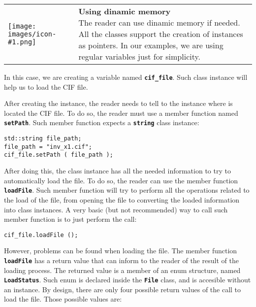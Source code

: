 \documentclass[11pt,twoside,openany,x11names,svgnames]{memoir}
\makeatletter
\newcommand{\IconNote}[3]
{
	\begin{table}[ht]
	\begin{tabular}{ lm{\dimexpr\textwidth-8\tabcolsep-\wd0}@{}}
		\toprule
		\texttt{[image: images/icon-\#1.png]}
		&
		\parbox[t]{155mm}{
		\textbf{#2} \\
		#3
		}
	\end{tabular}
\end{table}
}
\makeatother
\begin{document}
\IconNote
	{info}
	{Using dinamic memory}
	{The reader can use dinamic memory if needed. All the classes support the creation of instances as pointers. In our examples, we are using regular variables just for simplicity.}

In this case, we are creating a variable named \textbf{\texttt{cif\_file}}. Such class instance will help us to load the CIF file.

After creating the instance, the reader needs to tell to the instance where is located the CIF file. To do so, the reader must use a member function named \textbf{\texttt{setPath}}. Such member function expects a \textbf{\texttt{string}} class instance:

\begin{lstlisting}[frame=single,style=CPPStyle]
std::string file_path;
file_path = "inv_x1.cif";
cif_file.setPath ( file_path );
\end{lstlisting}

After doing this, the class instance has all the needed information to try to automatically load the file. To do so, the reader can use the member function \textbf{\texttt{loadFile}}. Such member function will try to perform all the operations related to the load of the file, from opening the file to converting the loaded information into class instances. A very basic (but not recommended) way to call such member function is to just perform the call:

\begin{lstlisting}[frame=single,style=CPPStyle]
cif_file.loadFile ();
\end{lstlisting}

However, problems can be found when loading the file. The member function \textbf{\texttt{loadFile}} has a return value that can inform to the reader of the result of the loading process. The returned value is a member of an enum structure, named \textbf{\texttt{LoadStatus}}. Such enum is declared inside the \textbf{\texttt{File}} class, and is accesible without an instance. By design, there are only four possible return values of the call to load the file. Those possible values are:
\end{document}
